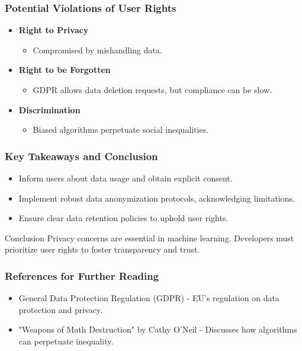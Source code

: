 \documentclass[aspectratio=169]{beamer}
\begin{document}
\begin{frame}[fragile]
    \frametitle{Potential Violations of User Rights}
    \begin{itemize}
        \item \textbf{Right to Privacy}
            \begin{itemize}
                \item Compromised by mishandling data.
            \end{itemize}
        \item \textbf{Right to be Forgotten}
            \begin{itemize}
                \item GDPR allows data deletion requests, but compliance can be slow.
            \end{itemize}
        \item \textbf{Discrimination}
            \begin{itemize}
                \item Biased algorithms perpetuate social inequalities.
            \end{itemize}
    \end{itemize}
\end{frame}

\begin{frame}[fragile]
    \frametitle{Key Takeaways and Conclusion}
    \begin{itemize}
        \item Inform users about data usage and obtain explicit consent.
        \item Implement robust data anonymization protocols, acknowledging limitations.
        \item Ensure clear data retention policies to uphold user rights.
    \end{itemize}
    \begin{block}{Conclusion}
    Privacy concerns are essential in machine learning. Developers must prioritize user rights to foster transparency and trust.
    \end{block}
\end{frame}

\begin{frame}[fragile]
    \frametitle{References for Further Reading}
    \begin{itemize}
        \item General Data Protection Regulation (GDPR) - EU's regulation on data protection and privacy.
        \item "Weapons of Math Destruction" by Cathy O'Neil - Discusses how algorithms can perpetuate inequality.
    \end{itemize}
\end{frame}
\end{document}
